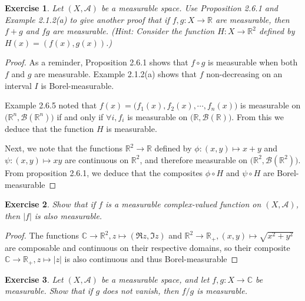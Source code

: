 \documentclass[11pt,a4paper,twoside]{article}
\newtheorem{exercise}{Exercise}
\begin{document}
\begin{exercise}
  Let $(X,\mathscr{A})$ be a measurable space. Use Proposition 2.6.1
  and Example 2.1.2(a) to give another proof that if
  $f,g:X\to\mathbb{R}$ are measurable, then $f+g$ and $fg$ are
  measurable. (Hint: Consider the function $H:X\to\mathbb{R}^2$
  defined by $H(x)=(f(x),g(x))$.)
\end{exercise}

\begin{proof}
  As a reminder, Proposition 2.6.1 shows that $f\circ g$ is measurable
  when both $f$ and $g$ are measurable. Example 2.1.2(a) shows that
  $f$ non-decreasing on an interval $I$ is Borel-measurable.

  Example 2.6.5 noted that
  $f(x)=\big(f_1(x),f_2(x),\cdots,f_n(x)\big)$ is measurable on
  $\big(\mathbb{R}^n,\mathscr{B}(\mathbb{R}^n)\big)$ if and only if
  $\forall i, f_i$ is measurable on
  $\big(\mathbb{R},\mathscr{B}(\mathbb{R})\big)$. From this we deduce
  that the function $H$ is measurable.

  Next, we note that the functions $\mathbb{R}^2\to\mathbb{R}$ defined
  by $\phi:(x,y)\mapsto x + y$ and $\psi:(x,y)\mapsto xy$ are
  continuous on $\mathbb{R}^2$, and therefore measurable on
  $\big(\mathbb{R}^2,\mathscr{B}(\mathbb{R}^2)\big)$. From proposition
  2.6.1, we deduce that the composites $\phi\circ H$ and $\psi\circ H$
  are Borel-measurable
\end{proof}


\begin{exercise}
  Show that if $f$ is a measurable complex-valued function on
  $(X,\mathscr{A})$, then $|f|$ is also measurable.
\end{exercise}

\begin{proof}
  The functions $\mathbb{C}\to\mathbb{R}^2, z\mapsto(\Re z, \Im z)$
  and $\mathbb{R}^2\to\mathbb{R}_+, (x,y)\mapsto \sqrt{x^2+y^2}$ are
  composable and continuous on their respective domains, so their
  composite $\mathbb{C}\to\mathbb{R}_+, z\mapsto|z|$ is also
  continuous and thus Borel-measurable
\end{proof}


\begin{exercise}
Let $(X,\mathscr{A})$ be a measurable space, and let
$f,g:X\to\mathbb{C}$ be measurable. Show that if $g$ does not vanish,
then $f/g$ is measurable.
\end{exercise}
\end{document}
